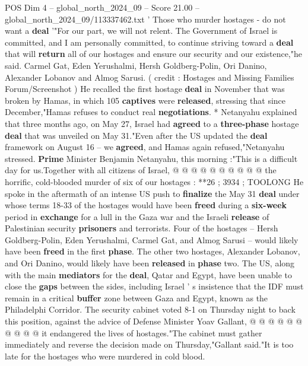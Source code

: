 \begin{textsample}{POS Dim 4 – global\_north\_2024\_09 – Score 21.00 – global\_north\_2024\_09/113337462.txt}  \label{ex:f4_pos_322}
' Those who murder hostages - do not want a \textbf{deal} '"For our part, we will not relent.
The Government of Israel is committed, and I am personally committed, to continue striving toward a \textbf{deal} that will \textbf{return} all of our hostages and ensure our security and our existence,"he said.
Carmel Gat, Eden Yerushalmi, Hersh Goldberg-Polin, Ori Danino, Alexander Lobanov and Almog Sarusi. ( credit : Hostages and Missing Families Forum/Screenshot ) He recalled the first hostage \textbf{deal} in November that was broken by Hamas, in which 105 \textbf{captives} were \textbf{released}, stressing that since December,"Hamas refuses to conduct real \textbf{negotiations}. * Netanyahu explained that three months ago, on May 27, Israel had \textbf{agreed} to a \textbf{three-phase} hostage \textbf{deal} that was unveiled on May 31."Even after the US updated the \textbf{deal} framework on August 16 -- we \textbf{agreed}, and Hamas again refused,"Netanyahu stressed. \textbf{Prime} Minister Benjamin Netanyahu, this morning :"This is a difficult day for us.Together with all citizens of Israel, @ @ @ @ @ @ @ @ @ @ the horrific, cold-blooded murder of six of our hostages : **26 ; 3934 ; TOOLONG He spoke in the aftermath of an intense US push to \textbf{finalize} the May 31 \textbf{deal} under whose terms 18-33 of the hostages would have been \textbf{freed} during a \textbf{six-week} period in \textbf{exchange} for a lull in the Gaza war and the Israeli \textbf{release} of Palestinian security \textbf{prisoners} and terrorists.
Four of the hostages -- Hersh Goldberg-Polin, Eden Yerushalmi, Carmel Gat, and Almog Sarusi -- would likely have been \textbf{freed} in the first \textbf{phase}.
The other two hostages, Alexander Lobanov, and Ori Danino, would likely have been \textbf{released} in \textbf{phase} two.
The US, along with the main \textbf{mediators} for the \textbf{deal}, Qatar and Egypt, have been unable to close the \textbf{gaps} between the sides, including Israel ' s insistence that the IDF must remain in a critical \textbf{buffer} zone between Gaza and Egypt, known as the Philadelphi Corridor.
The security cabinet voted 8-1 on Thursday night to back this position, against the advice of Defense Minister Yoav Gallant, @ @ @ @ @ @ @ @ @ @ it endangered the lives of hostages."The cabinet must gather immediately and reverse the decision made on Thursday,"Gallant said."It is too late for the hostages who were murdered in cold blood.

\end{textsample}
